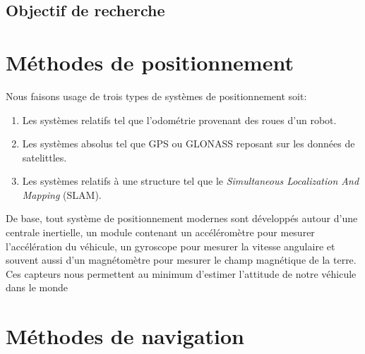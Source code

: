 \subsection{Objectif de recherche}

\section{Méthodes de positionnement}

Nous faisons usage de trois types de systèmes de positionnement soit:
\begin{enumerate}
  \item Les systèmes relatifs tel que l'odométrie provenant des roues d'un robot.
  \item Les systèmes absolus tel que GPS ou GLONASS reposant sur les données de satelittles.
  \item Les systèmes relatifs à une structure tel que le \textit{Simultaneous Localization And Mapping} (SLAM).
\end{enumerate}

De base, tout système de positionnement modernes sont développés autour d'une centrale inertielle, un module contenant un accéléromètre pour mesurer l'accélération du véhicule, un gyroscope pour mesurer la vitesse angulaire et souvent aussi d'un magnétomètre pour mesurer le champ magnétique de la terre. Ces capteurs nous permettent au minimum d'estimer l'attitude de notre véhicule dans le monde

\section{Méthodes de navigation}
